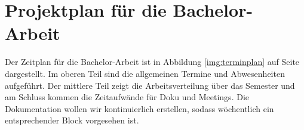 \section{Projektplan für die Bachelor-Arbeit}
Der Zeitplan für die Bachelor-Arbeit ist in Abbildung \ref{img:terminplan} auf Seite \pageref{img:terminplan} dargestellt.
Im oberen Teil sind die allgemeinen Termine und Abwesenheiten aufgeführt. Der mittlere Teil zeigt die Arbeitsverteilung über das Semester und am Schluss kommen die Zeitaufwände für Doku und Meetings. Die Dokumentation wollen wir kontinuierlich erstellen, sodass wöchentlich ein entsprechender Block vorgesehen ist.
\newpage
\clearpage
\pagebreak
{}
